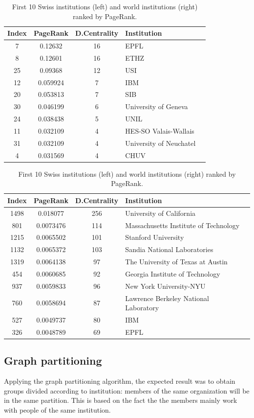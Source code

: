 \documentclass[]{usiinfbachelorproject}
\begin{document}
\newcommand\ddd{\centering}
\begin{table}[tbh]
\centering
\tiny
\caption{First 10 Swiss institutions (left) and world institutions (right)  ranked by PageRank.}
\begin{tabular}{c c c l l}
\textbf{Index} & \textbf{PageRank} & \textbf{D.Centrality} & \textbf{Institution}\\
\hline
7 & 0.12632 & 16 & EPFL \\
8 & 0.12601 & 16 & ETHZ \\
25 & 0.09368 & 12 & USI \\
12 & 0.059924 & 7 & IBM \\
20 & 0.053813 & 7 & SIB \\
30 & 0.046199 & 6 & University of Geneva \\
24 & 0.038438 & 5 & UNIL \\
11 & 0.032109 & 4 & HES-SO Valais-Wallais\\
31 & 0.032109 & 4 & University of Neuchatel \\
4 & 0.031569 & 4 & CHUV
\end{tabular}
\qquad\qquad
\begin{tabular}{c c c l l}
\textbf{Index} & \textbf{PageRank} & \textbf{D.Centrality} & \textbf{Institution}\\
\hline
1498 & 0.018077 & 256 & University of California \\
801 & 0.0073476 & 114 & Massachusetts Institute of Technology \\
1215 & 0.0065502 & 101 & Stanford University \\
1132 & 0.0065372 & 103 & Sandia National Laboratories \\
1319 & 0.0064138 & 97 & The University of Texas at Austin \\
454 & 0.0060685 & 92 & Georgia Institute of Technology \\
937 & 0.0059833 & 96 & New York University-NYU \\
760 & 0.0058694 & 87 & Lawrence Berkeley National Laboratory\\
527 & 0.0049737 & 80 & IBM \\
326 & 0.0048789 & 69 & EPFL
\end{tabular}
\label{table:PRUNI}
\end{table}


\subsection{Graph partitioning}
Applying the graph partitioning algorithm, the expected result was to obtain groups divided according to institution: members of the same organization will be in the same partition. This is based on the fact the the members mainly work with people of the same institution. 
\end{document}
